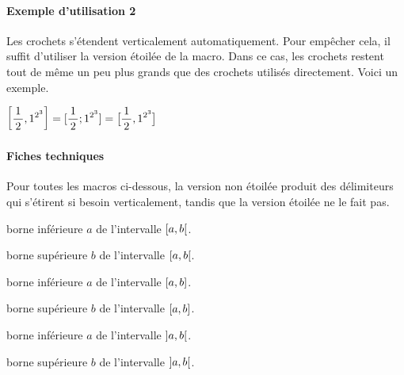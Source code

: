 \documentclass[12pt,a4paper]{article}
\theoremstyle{definition}
\begin{document}
\paragraph{Exemple d'utilisation 2}

Les crochets s'étendent verticalement automatiquement. Pour empêcher cela, il suffit d'utiliser la version étoilée de la macro.
Dans ce cas, les crochets restent tout de même un peu plus grands que des crochets utilisés directement. Voici un exemple.

\begin{tcblisting}{}
$\displaystyle \intervalC{ \frac{1}{2} }{ 1^{2^{3}} }
             = [ \frac{1}{2} ; 1^{2^{3}} ]
             = \intervalC*{ \frac{1}{2} }{ 1^{2^{3}} }$
\end{tcblisting}


\paragraph{Fiches techniques}

Pour toutes les macros ci-dessous, la version non étoilée produit des délimiteurs qui s'étirent si besoin verticalement, tandis que la version étoilée ne le fait pas.


\bigskip





 borne inférieure $a$ de l'intervalle $\intervalCO{a}{b}$.

 borne supérieure $b$ de l'intervalle $\intervalCO{a}{b}$.


\bigskip




 borne inférieure $a$ de l'intervalle $\intervalC{a}{b}$.

 borne supérieure $b$ de l'intervalle $\intervalC{a}{b}$.


\bigskip




 borne inférieure $a$ de l'intervalle $\intervalO{a}{b}$.

 borne supérieure $b$ de l'intervalle $\intervalO{a}{b}$.


\bigskip
\end{document}
